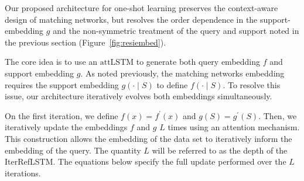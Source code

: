 \documentclass[journal=jacsat,manuscript=article]{achemso}
\begin{document}
Our proposed architecture for one-shot learning preserves the context-aware design of matching networks, but resolves the order dependence in the support-embedding $g$ and the non-symmetric treatment of the query and support noted in the previous section (Figure~\ref{fig:resiembed}).

The core idea is to use an $\text{attLSTM}$ to generate both query embedding $f$ and support embedding $g$. As noted previously, the matching networks \cite{vinyals2016matching} embedding requires the support embedding $g(\cdot \mid S)$ to define $f(\cdot \mid S)$. To resolve this issue, our architecture iteratively evolves both embeddings simultaneously.

On the first iteration, we define $f(x) = f^\prime(x)$ and $g(S)= g^\prime(S)$. Then, we iteratively update the embeddings $f$ and $g$ $L$ times using an attention mechanism. This construction allows the embedding of the data set to iteratively inform the embedding of the query. The quantity $L$ will be referred to as the depth of the IterRefLSTM. The equations below specify the full update performed over the $L$ iterations.
\end{document}
